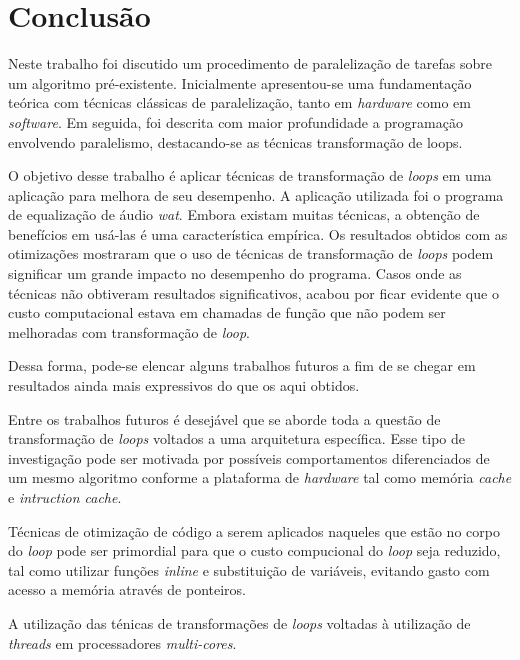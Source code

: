 \chapter{Conclusão}

Neste trabalho foi discutido um procedimento de paralelização de tarefas sobre 
um algoritmo pré-existente. 
Inicialmente apresentou-se uma fundamentação teórica com técnicas clássicas de 
paralelização, tanto em \textit{hardware} como em \textit{software}. 
Em seguida, foi descrita com maior profundidade a programação envolvendo 
paralelismo, destacando-se as técnicas transformação de loops.

O objetivo desse trabalho é aplicar técnicas de transformação de \textit{loops} 
em uma aplicação para melhora de seu desempenho. 
A aplicação utilizada foi o programa de equalização de áudio \textit{wat}. 
Embora existam muitas técnicas, a obtenção de benefícios em usá-las é uma 
característica empírica. 
Os resultados obtidos com as otimizações mostraram que o uso de técnicas de
transformação de \textit{loops} podem significar um grande impacto no desempenho
do programa.
Casos onde as técnicas não obtiveram resultados significativos, acabou por ficar
evidente que o custo computacional estava em chamadas de função que não podem
ser melhoradas com transformação de \textit{loop}.

Dessa forma, pode-se elencar alguns trabalhos futuros a fim de se chegar em 
resultados ainda mais expressivos do que os aqui obtidos. 

Entre os trabalhos futuros é desejável que se aborde toda a questão de 
transformação de \textit{loops} voltados a uma arquitetura específica. 
Esse tipo de investigação pode ser motivada por possíveis comportamentos 
diferenciados de um mesmo algoritmo conforme a plataforma de 
\textit{hardware} tal como memória \textit{cache} e \textit{intruction cache}.

Técnicas de otimização de código a serem aplicados naqueles que estão no
corpo do \textit{loop} pode ser primordial para que o custo compucional do
\textit{loop} seja reduzido, tal como utilizar funções \textit{inline} e
substituição de variáveis, evitando gasto com acesso a memória através de
ponteiros.

A utilização das ténicas de transformações de \textit{loops} voltadas à
utilização de \textit{threads} em processadores \textit{multi-cores}.
